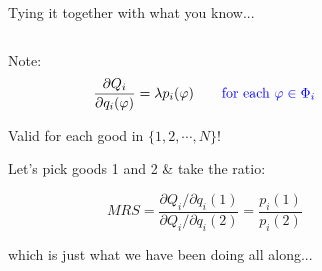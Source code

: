 \documentclass[notes,11pt, aspectratio=169, xcolor=table]{beamer}
\newcommand{\blue}[1]{\textcolor{blue}{#1}}
\newenvironment{wideitemize}{\itemize\addtolength{\itemsep}{10pt}}{\enditemize}
\begin{document}
\begin{frame}{Tying it together with what you know...}
\begin{columns}
    \begin{column}{0.5\textwidth}
        \begin{wideitemize}
            \item Note:
\begin{equation*}
    \frac{\partial Q_i}{\partial q_{i}(\varphi)}  =  \lambda p_i(\varphi) \qquad \blue{\text{for each } \varphi \in \Phi_i}
\end{equation*}

\item<2-> Valid for each good in $\{1,2,\cdots,N\}$!

\item<3-> Let's pick goods 1 and 2 \& take the ratio:

\begin{equation*}
    MRS = \frac{\partial Q_i / \partial q_{i}(1)}{\partial Q_i / \partial q_{i}(2)} =  \frac{p_i(1)}{p_i(2)}
\end{equation*}

which is just what we have been doing all along...

        \end{wideitemize}


    \end{column}
    
    \begin{column}{0.5\textwidth}
\end{column}
\end{columns}
\end{frame}
\end{document}
